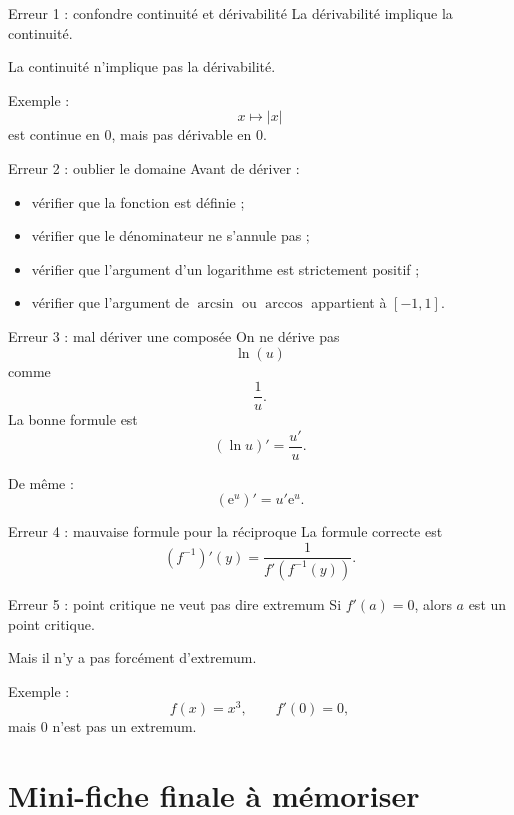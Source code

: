 \documentclass[11pt,a4paper]{article}
\newcommand{\e}{\mathrm{e}}
\begin{document}
\begin{warningbox}{Erreur 1 : confondre continuité et dérivabilité}
La dérivabilité implique la continuité.

La continuité n'implique pas la dérivabilité.

Exemple :
\[
x\mapsto |x|
\]
est continue en $0$, mais pas dérivable en $0$.
\end{warningbox}

\begin{warningbox}{Erreur 2 : oublier le domaine}
Avant de dériver :
\begin{itemize}
    \item vérifier que la fonction est définie ;
    \item vérifier que le dénominateur ne s'annule pas ;
    \item vérifier que l'argument d'un logarithme est strictement positif ;
    \item vérifier que l'argument de $\arcsin$ ou $\arccos$ appartient à $[-1,1]$.
\end{itemize}
\end{warningbox}

\begin{warningbox}{Erreur 3 : mal dériver une composée}
On ne dérive pas
\[
\ln(u)
\]
comme
\[
\frac1u.
\]
La bonne formule est
\[
(\ln u)'=\frac{u'}u.
\]

De même :
\[
(\e^u)'=u'\e^u.
\]
\end{warningbox}

\begin{warningbox}{Erreur 4 : mauvaise formule pour la réciproque}
La formule correcte est
\[
(f^{-1})'(y)=\frac1{f'(f^{-1}(y))}.
\]
\end{warningbox}

\begin{warningbox}{Erreur 5 : point critique ne veut pas dire extremum}
Si $f'(a)=0$, alors $a$ est un point critique.

Mais il n'y a pas forcément d'extremum.

Exemple :
\[
f(x)=x^3,
\qquad
f'(0)=0,
\]
mais $0$ n'est pas un extremum.
\end{warningbox}

\section{Mini-fiche finale à mémoriser}
\end{document}
